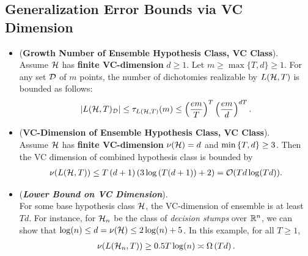 \documentclass[11pt]{article}
\begin{document}
\subsection{Generalization Error Bounds via VC Dimension}
\begin{itemize}
\item \begin{lemma} (\textbf{Growth Number of Ensemble Hypothesis Class, VC Class}). \citep{schapire2012boosting}\\
Assume ${\mathcal H}$ has \textbf{finite VC-dimension} $d \ge 1$. Let $m \ge \max\{T, d\} \ge 1$. For any set ${\mathcal D}$ of $m$ points, the number of dichotomies realizable by $L({\mathcal H}, T)$ is bounded as follows:
\begin{align}
\left\lvert L({\mathcal H}, T)_{{\mathcal D}} \right\rvert \le \tau_{L({\mathcal H}, T)}(m) \le \left(\frac{em}{T}\right)^T \left(\frac{em}{d}\right)^{dT}.  \label{ineqn: growth_fun_ensemble_infinite}
\end{align}
\end{lemma}

\item \begin{lemma} (\textbf{VC-Dimension of Ensemble Hypothesis Class, VC Class}). \citep{schapire2012boosting, shalev2014understanding}\\
Assume ${\mathcal H}$ has \textbf{finite VC-dimension} $\nu({\mathcal H}) = d$ and $\min\left\{T, d\right\} \ge 3$. Then the VC dimension of combined hypothesis class is bounded by
\begin{align}
\nu(L({\mathcal H}, T)) \le T\left(d + 1\right)\left(3\log\left(T(d+1)\right) + 2\right) = {\mathcal O}(Td \log(Td)).  \label{ineqn: vc_dim_ensemble_infinite}
\end{align}
\end{lemma}

\item \begin{remark}(\textbf{\emph{Lower Bound on VC Dimension}}). \citep{shalev2014understanding}\\
For some base hypothesis class ${\mathcal H}$, the VC-dimension of ensemble is at least $Td$. For instance, for ${\mathcal H}_n$  be the class of \emph{decision stumps} over ${\mathbb R}^n$,  we can show that $\log(n) \le d = \nu({\mathcal H}) \le 2\log(n) + 5$.  In this example, for all $T \ge 1$, 
\begin{align*}
\nu(L({\mathcal H}_n, T)) \ge 0.5T\log(n) \asymp \Omega\left(Td\right).
\end{align*} 
\end{remark}


\end{itemize}
\end{document}
